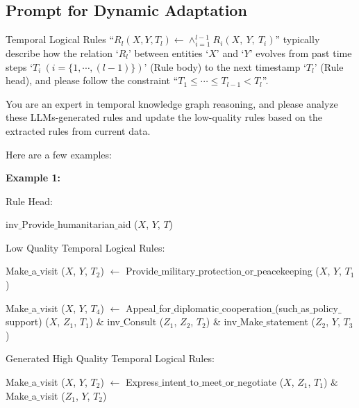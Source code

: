 \documentclass{article}
\begin{document}
\clearpage

\subsection{Prompt for Dynamic Adaptation}\label{prompt1}
\begin{tcolorbox}[colback=white!5!white, colframe=black!75!black, title=Prompt for Dynamic Adaptation]
\hspace*{0.5cm} Temporal Logical Rules ``$R_l(X, Y, T_l) \leftarrow \wedge_{i=1}^{l-1}R_i (X,\ Y,\ T_i)$'' typically describe how the relation `$R_l$' between entities `$X$' and `$Y$' evolves from past time steps `$T_i\ (i=\{1, \cdots ,(l-1)\})$' (Rule body) to the next timestamp `$T_l$' (Rule head), and please follow the constraint ``$T_1 \leq \cdots \leq T_{l-1} < T_l$''.

\bigskip
\hspace*{0.5cm} You are an expert in temporal knowledge graph reasoning, and please analyze these
LLMs-generated rules and update the low-quality rules based on the extracted rules from current data. 

\bigskip
Here are a few examples: 

\textbf{Example 1:}

\hspace*{0.5cm} Rule Head: 

\hspace*{1cm} inv$\_$Provide$\_$humanitarian$\_$aid ($X$, $Y$, $T$)

\hspace*{0.5cm} Low Quality Temporal Logical Rules:

\hspace*{1cm}
Make$\_$a$\_$visit ($X$, $Y$, $T_2$) $\leftarrow$ Provide$\_$military$\_$protection$\_$or$\_$peacekeeping ($X$, $Y$, $T_1$)

\hspace*{1cm}
Make$\_$a$\_$visit ($X$, $Y$, $T_4$) $\leftarrow$ Appeal$\_$for$\_$diplomatic$\_$cooperation$\_$(such$\_$as$\_$policy$\_$ support) ($X$, $Z_1$, $T_1$) $\&$ inv$\_$Consult ($Z_1$, $Z_2$, $T_2$) $\&$ inv$\_$Make$\_$statement ($Z_2$, $Y$, $T_3$)

\hspace*{0.5cm} Generated High Quality Temporal Logical Rules:

\hspace*{1cm} Make$\_$a$\_$visit ($X$, $Y$, $T_2$) $\leftarrow$ Express$\_$intent$\_$to$\_$meet$\_$or$\_$negotiate ($X$, $Z_1$, $T_1$) $\&$ Make$\_$a$\_$visit ($Z_1$, $Y$, $T_2$)


\end{tcolorbox}
\end{document}
